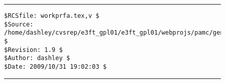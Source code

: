 \noindent\begin{figure}[!b]
\noindent\rule[-0.25in]{\textwidth}{1pt}
\begin{tiny}
\begin{verbatim}
$RCSfile: workprfa.tex,v $
$Source: /home/dashley/cvsrep/e3ft_gpl01/e3ft_gpl01/webprojs/pamc/gen_a/docs/manual/man_a/comps/workprfa.tex,v $
$Revision: 1.9 $
$Author: dashley $
$Date: 2009/10/31 19:02:03 $
\end{verbatim}
\end{tiny}
\noindent\rule[0.25in]{\textwidth}{1pt}
\end{figure}

%
%
%
%
%
%
%
%
%

